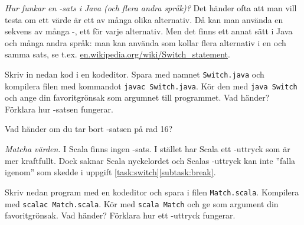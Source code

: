 

\Exercise{\ExeWeekEIGHT}

\begin{Goals}
\item 
\end{Goals}

\begin{Preparations}
\item 
\end{Preparations}

\BasicTasks %

\Task \label{task:switch} \emph{Hur funkar en -sats i Java (och flera andra språk)?} Det händer ofta att man vill testa om ett värde är ett av många olika alternativ. Då kan man använda en sekvens av många -, ett för varje alternativ. Men det finns ett annat sätt i Java och många andra språk: man kan använda  som kollar flera alternativ i en och samma sats, se t.ex. \href{https://en.wikipedia.org/wiki/Switch_statement}{en.wikipedia.org/wiki/Switch\_statement}.

\Subtask Skriv in nedan kod i en kodeditor. Spara med namnet \texttt{Switch.java} och kompilera filen med kommandot \texttt{javac Switch.java}. Kör den med \texttt{java Switch} och ange din favoritgrönsak som argumnet till programmet. Vad händer? Förklara hur -satsen fungerar.


\Subtask \label{subtask:break} Vad händer om du tar bort -satsen på rad 16?




\Task \label{task:vegomatch} \emph{Matcha värden.} I Scala finns ingen -sats. I stället har Scala ett -uttryck som är mer kraftfullt. Dock saknar Scala nyckelordet  och Scalas -uttryck kan inte ''falla igenom'' som skedde i uppgift \ref{task:switch}\ref{subtask:break}.

\Subtask \label{subtask:vegomatch} Skriv nedan program med en kodeditor och spara i filen \texttt{Match.scala}. Kompilera med \texttt{scalac Match.scala}. Kör med \texttt{scala Match} och ge som argument din favoritgrönsak. Vad händer? Förklara hur ett -uttryck fungerar.


